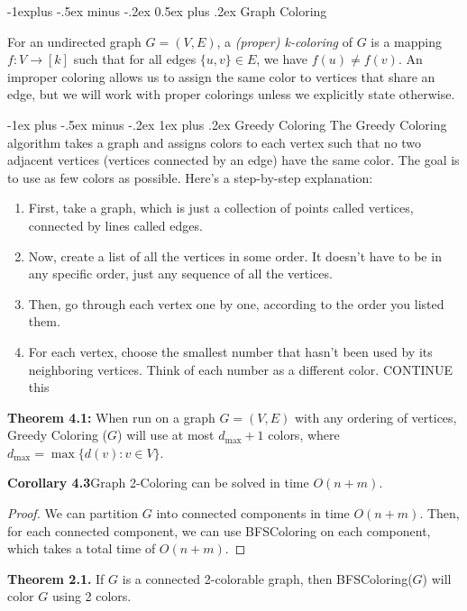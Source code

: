 \documentclass[10pt,landscape]{article}
\makeatletter
\renewcommand{\subsection}{\@startsection{subsection}{2}{0mm}%
                                {-1explus -.5ex minus -.2ex}%
                                {0.5ex plus .2ex}%
                                {\normalfont\normalsize\bfseries}}
\renewcommand{\subsubsection}{\@startsection{subsubsection}{3}{0mm}%
                                {-1ex plus -.5ex minus -.2ex}%
                                {1ex plus .2ex}%
                                {\normalfont\small\bfseries}}
\makeatother
\begin{document}
\begin{multicols*}{3}
\subsection{Graph Coloring}

For an undirected graph $G = (V, E)$, a \textit{(proper) k-coloring} of $G$ is a mapping
$f : V \to [k]$ such that for all edges $\{u, v\} \in E$, we have $f(u) \neq f(v)$.
An improper coloring allows us to assign the same color to vertices that share an edge, but we
will work with proper colorings unless we explicitly state otherwise.

\subsubsection{Greedy Coloring}
The Greedy Coloring algorithm takes a graph and assigns colors to each vertex such that no two adjacent vertices (vertices connected by an edge) have the same color. The goal is to use as few colors as possible. Here's a step-by-step explanation:

\begin{enumerate}
\item First, take a graph, which is just a collection of points called vertices, connected by lines called edges.
\item Now, create a list of all the vertices in some order. It doesn't have to be in any specific order, just any sequence of all the vertices.
\item Then, go through each vertex one by one, according to the order you listed them.
\item For each vertex, choose the smallest number that hasn't been used by its neighboring vertices. Think of each number as a different color. CONTINUE this
\end{enumerate}


\textbf{Theorem 4.1: }When run on a graph $G = (V, E)$ with any ordering of vertices, Greedy Coloring ($G$) will use at most $d_{\text{max}} + 1$ colors, where $d_{\text{max}} = \max\{d(v) : v \in V\}$.

\textbf{Corollary 4.3}Graph 2-Coloring can be solved in time $O(n + m)$.

\begin{proof}
We can partition $G$ into connected components in time $O(n+m)$. Then, for each connected component, we can use BFSColoring on each component, which takes a total time of $O(n + m)$.
\end{proof}

\textbf{Theorem 2.1.} If $G$ is a connected 2-colorable graph, then BFSColoring($G$) will color $G$ using 2 colors.



\end{multicols*}
\end{document}
